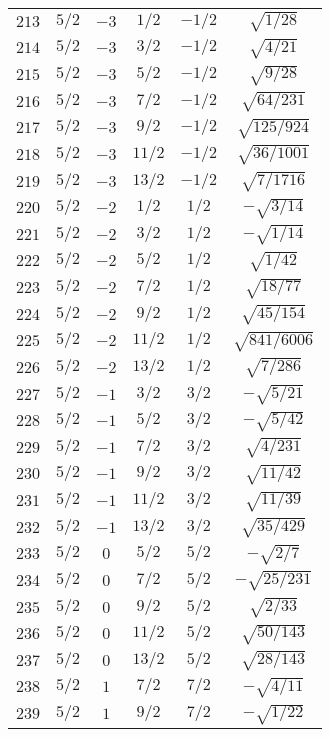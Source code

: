 \begin{table}
\begin{center}
\begin{tabular}{|c|c|c|c|c|c|}
$213$ & $5/2$ & $-3$ & $1/2$ & $-1/2$ & $\sqrt{1/28}$ \\ 
$214$ & $5/2$ & $-3$ & $3/2$ & $-1/2$ & $\sqrt{4/21}$ \\ 
$215$ & $5/2$ & $-3$ & $5/2$ & $-1/2$ & $\sqrt{9/28}$ \\ 
$216$ & $5/2$ & $-3$ & $7/2$ & $-1/2$ & $\sqrt{64/231}$ \\ 
$217$ & $5/2$ & $-3$ & $9/2$ & $-1/2$ & $\sqrt{125/924}$ \\ 
$218$ & $5/2$ & $-3$ & $11/2$ & $-1/2$ & $\sqrt{36/1001}$ \\ 
$219$ & $5/2$ & $-3$ & $13/2$ & $-1/2$ & $\sqrt{7/1716}$ \\ 
$220$ & $5/2$ & $-2$ & $1/2$ & $1/2$ & $-\sqrt{3/14}$ \\ 
$221$ & $5/2$ & $-2$ & $3/2$ & $1/2$ & $-\sqrt{1/14}$ \\ 
$222$ & $5/2$ & $-2$ & $5/2$ & $1/2$ & $\sqrt{1/42}$ \\ 
$223$ & $5/2$ & $-2$ & $7/2$ & $1/2$ & $\sqrt{18/77}$ \\ 
$224$ & $5/2$ & $-2$ & $9/2$ & $1/2$ & $\sqrt{45/154}$ \\ 
$225$ & $5/2$ & $-2$ & $11/2$ & $1/2$ & $\sqrt{841/6006}$ \\ 
$226$ & $5/2$ & $-2$ & $13/2$ & $1/2$ & $\sqrt{7/286}$ \\ 
$227$ & $5/2$ & $-1$ & $3/2$ & $3/2$ & $-\sqrt{5/21}$ \\ 
$228$ & $5/2$ & $-1$ & $5/2$ & $3/2$ & $-\sqrt{5/42}$ \\ 
$229$ & $5/2$ & $-1$ & $7/2$ & $3/2$ & $\sqrt{4/231}$ \\ 
$230$ & $5/2$ & $-1$ & $9/2$ & $3/2$ & $\sqrt{11/42}$ \\ 
$231$ & $5/2$ & $-1$ & $11/2$ & $3/2$ & $\sqrt{11/39}$ \\ 
$232$ & $5/2$ & $-1$ & $13/2$ & $3/2$ & $\sqrt{35/429}$ \\ 
$233$ & $5/2$ & $0$ & $5/2$ & $5/2$ & $-\sqrt{2/7}$ \\ 
$234$ & $5/2$ & $0$ & $7/2$ & $5/2$ & $-\sqrt{25/231}$ \\ 
$235$ & $5/2$ & $0$ & $9/2$ & $5/2$ & $\sqrt{2/33}$ \\ 
$236$ & $5/2$ & $0$ & $11/2$ & $5/2$ & $\sqrt{50/143}$ \\ 
$237$ & $5/2$ & $0$ & $13/2$ & $5/2$ & $\sqrt{28/143}$ \\ 
$238$ & $5/2$ & $1$ & $7/2$ & $7/2$ & $-\sqrt{4/11}$ \\ 
$239$ & $5/2$ & $1$ & $9/2$ & $7/2$ & $-\sqrt{1/22}$ \\ 

\end{tabular}
\end{center}
\end{table}
